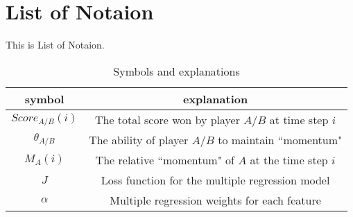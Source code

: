 \section{List of Notaion} %

\indent This is List of Notaion.

\begin{table}[ht]
\centering
\caption{Symbols and explanations}
\begin{tabular}{cc}
\toprule 
symbol & explanation\\
\midrule
$Score_{A/B}(i)$ & The total score won by player $A/B$ at time step $i$ \\
$\theta_{A/B}$ & The ability of player $A/B$ to maintain ``momentum" \\
$M_{A}(i)$ & The relative ``momentum" of $A$ at the time step $i$ \\
$J$ & Loss function for the multiple regression model \\
$\alpha$ & Multiple regression weights for each feature\\
\bottomrule
\end{tabular}
\end{table}

